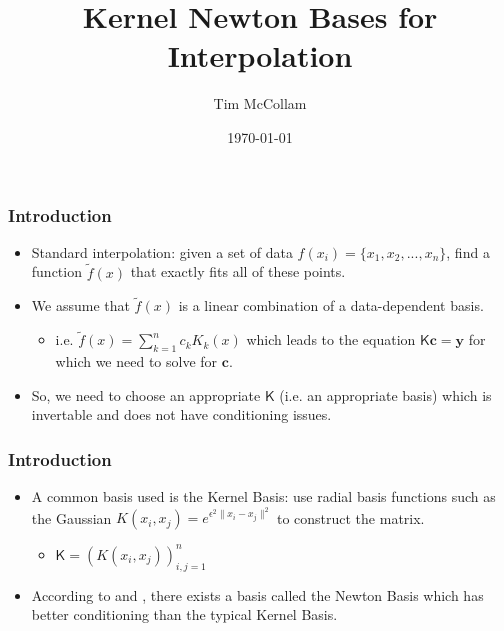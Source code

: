 \documentclass{beamer}
\title[Newton Bases for Interpolation]{Kernel Newton Bases for Interpolation} %
\author{Tim McCollam} %
\institute[IIT] %
{
Illinois Institute of Technology \\ %
\medskip
\textit{tmccolla@hawk.iit.edu} %
}
\date{\today} %
\begin{document}
\begin{frame}
\titlepage %
\end{frame}



\begin{frame}
\frametitle{Introduction}
\begin{itemize}
\item Standard interpolation: given a set of data $f(x_i)=\{x_1, x_2, ... , x_n\}$, find a function $\tilde{f}(x)$ that exactly fits all of these points.
\item We assume that $\tilde{f}(x)$ is a linear combination of a data-dependent basis. 
\begin{itemize}
\item i.e. $\tilde{f}(x) = \sum\limits^{n}_{k=1}c_{k}K_{k}(x)$ which leads to the equation $\mathsf{K}\textbf{c}=\textbf{y}$ for which we need to solve for $\textbf{c}$.
\end{itemize}
\item So, we need to choose an appropriate $\mathsf{K}$ (i.e. an appropriate basis) which is invertable and does not have conditioning issues.
\end{itemize}
\end{frame}


\begin{frame}
\frametitle{Introduction}
\begin{itemize}
\item A common basis used is the Kernel Basis: use radial basis functions such as the Gaussian $K(x_i,x_j)=e^{\epsilon^2\|x_i-x_j\|^2}$ to construct the matrix.
\begin{itemize}
\item $\mathsf{K}=(K(x_i,x_j))^{n}_{i,j=1}$
\end{itemize}
\item According to  and , there exists a basis called the Newton Basis which has better conditioning than the typical Kernel Basis.
\end{itemize}
\end{frame}
\end{document}
